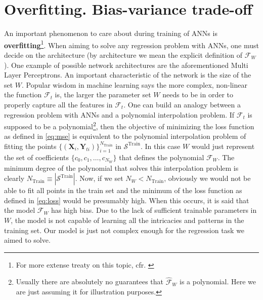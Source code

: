 \section{Overfitting. Bias-variance trade-off}
\indent An important phenomenon to care about during training of ANNs is \textbf{overfitting}\footnote{For more extense treaty on this topic, cfr. \cite{Marsland2015Machine}}. When aiming to solve any regression problem with ANNs, one must decide on the architecture (by architecture we mean the explicit definition of $\mathcal{{F}}_W$). One example of possible network architectures are the aforementioned Multi Layer Perceptrons. An important characteristic of the network is the size of the set $W$. Popular wisdom in machine learning says the more complex, non-linear the function $\mathcal{F}_t$ is, the larger the parameter set $W$ needs to be in order to properly capture all the features in $\mathcal{F}_t$. One can build an analogy between a regression problem with ANNs and a polynomial interpolation problem. If $\mathcal{F}_t$ is supposed to be a polynomial\footnote{Usually there are absolutely no guarantees that $\mathcal{\hat{F}}_W$ is a polynomial. Here we are just assuming it for illustration purposes.}, then the objective of minimizing the loss function as defined in \cref{eq:mse} is equivalent to the polynomial interpolation problem of fitting the points $\{(\mathbf{X}_i,\mathbf{Y}_{ti})\}_{i=1}^{N_{\text{Train}}}$ in $\mathcal{S}^\text{Train}$. In this case $W$ would just represent the set of coefficients $\{c_0,c_1,\ldots,c_{N_W}\}$ that defines the polynomial $\mathcal{{F}}_W$. The minimum degree of the polynomial that solves this interpolation problem is clearly $N_{\text{Train}}\equiv\left|\mathcal{S}^{\text{Train}}\right|$. Now, if we set $N_W<N_{\text{Train}}$, obviously we would not be able to fit all points in the train set and the minimum of the loss function as defined in \cref{eq:loss} would be presumably high. When this occurs, it is said that the model $\mathcal{{F}}_W$ has high bias. Due to the lack of sufficient trainable parameters in $W$, the model is not capable of learning all the intricacies and patterns in the training set. Our model is just not complex enough for the regression task we aimed to solve.\\
%
